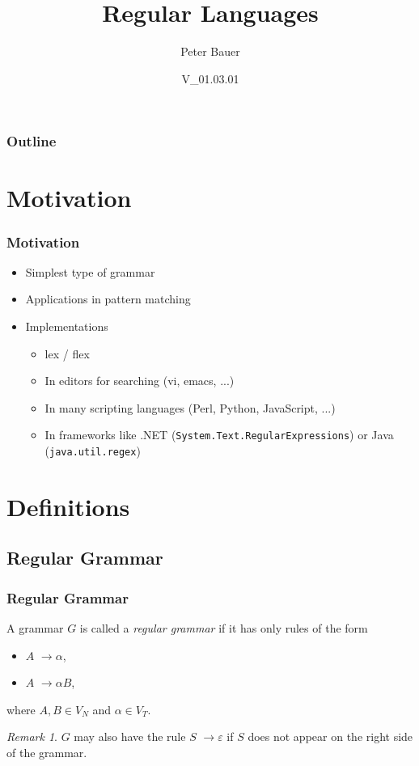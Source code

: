 \documentclass{beamer}
\title{Regular Languages}
\author{Peter Bauer}
\date{V\_01.03.01}
\theoremstyle{remark}
\newtheorem{remark}[theorem]{Remark}
\newcommand{\rewritten}{$\to$}
\begin{document}
\frame{\titlepage}

\begin{frame}
	\frametitle{Outline}
	\tableofcontents
\end{frame}

\section {Motivation}
\begin{frame}
	\frametitle{Motivation}
	
	\begin{itemize}
		\item Simplest type of grammar
		\item Applications in pattern matching
		\item Implementations
		\begin{itemize}
			\item lex / flex
			\item In editors for searching (vi, emacs, ...)
			\item In many scripting languages (Perl, Python, JavaScript, ...)
			\item In frameworks like .NET ({\tt System.Text.RegularExpressions}) or Java ({\tt java.util.regex})
		\end{itemize}
	\end{itemize}
\end{frame}

\section{Definitions}
\subsection {Regular Grammar}
\begin{frame}
	\frametitle{Regular Grammar}
	\begin{definition}
		A grammar $G$ is called a {\em regular grammar} if it has only rules of the form
		\begin{itemize}
			\item $A$ \rewritten $\alpha$,
			\item $A$ \rewritten $\alpha B$,
		\end{itemize}
		where $A, B \in V_N$ and $\alpha \in V_T$.
	\end{definition}
	
	\pause
	
	\begin{remark}
		$G$ may also have the rule $S$ \rewritten $\varepsilon$ if $S$ does not appear on the right side of the grammar.
	\end{remark}
\end{frame}
\end{document}
